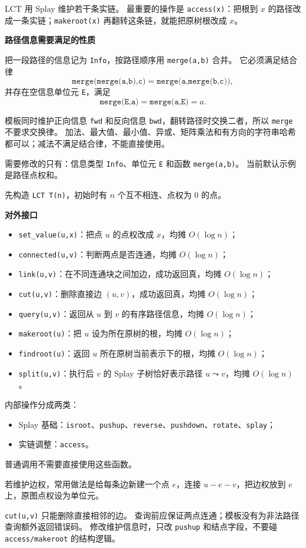 LCT 用 Splay 维护若干条实链。
最重要的操作是 \texttt{access(x)}：把根到 $x$ 的路径改成一条实链；\texttt{makeroot(x)} 再翻转这条链，就能把原树根改成 $x$。

\textbf{路径信息需要满足的性质}

把一段路径的信息记为 \texttt{Info}，按路径顺序用 \texttt{merge(a,b)} 合并。
它必须满足结合律
\[
  \texttt{merge(merge(a,b),c)}
  =\texttt{merge(a,merge(b,c))},
\]
并存在空信息单位元 \texttt{E}，满足
\[
  \texttt{merge(E,a)}=\texttt{merge(a,E)}=a.
\]

模板同时维护正向信息 \texttt{fwd} 和反向信息 \texttt{bwd}，翻转路径时交换二者，所以 \texttt{merge} 不要求交换律。
加法、最大值、最小值、异或、矩阵乘法和有方向的字符串哈希都可以；减法不满足结合律，不能直接使用。

需要修改的只有：信息类型 \texttt{Info}、单位元 \texttt{E} 和函数 \texttt{merge(a,b)}。
当前默认示例是路径点权和。

先构造 \texttt{LCT T(n)}，初始时有 $n$ 个互不相连、点权为 $0$ 的点。

\textbf{对外接口}

\begin{itemize}
  \item \texttt{set\_value(u,x)}：把点 $u$ 的点权改成 $x$，均摊 $O(\log n)$；
  \item \texttt{connected(u,v)}：判断两点是否连通，均摊 $O(\log n)$；
  \item \texttt{link(u,v)}：在不同连通块之间加边，成功返回真，均摊 $O(\log n)$；
  \item \texttt{cut(u,v)}：删除直接边 $(u,v)$，成功返回真，均摊 $O(\log n)$；
  \item \texttt{query(u,v)}：返回从 $u$ 到 $v$ 的有序路径信息，均摊 $O(\log n)$；
  \item \texttt{makeroot(u)}：把 $u$ 设为所在原树的根，均摊 $O(\log n)$；
  \item \texttt{findroot(u)}：返回 $u$ 所在原树当前表示下的根，均摊 $O(\log n)$；
  \item \texttt{split(u,v)}：执行后 $v$ 的 Splay 子树恰好表示路径 $u\leadsto v$，均摊 $O(\log n)$。
\end{itemize}

内部操作分成两类：

\begin{itemize}
  \item Splay 基础：\texttt{isroot}、\texttt{pushup}、\texttt{reverse}、\texttt{pushdown}、\texttt{rotate}、\texttt{splay}；
  \item 实链调整：\texttt{access}。
\end{itemize}

普通调用不需要直接使用这些函数。

若维护边权，常用做法是给每条边新建一个点 $e$，连接 $u-e-v$，把边权放到 $e$ 上，原图点权设为单位元。

\begin{icpcwarning}
\texttt{cut(u,v)} 只能删除直接相邻的边。
查询前应保证两点连通；模板没有为非法路径查询额外返回错误码。
修改维护信息时，只改 \texttt{pushup} 和结点字段，不要碰 \texttt{access/makeroot} 的结构逻辑。
\end{icpcwarning}
